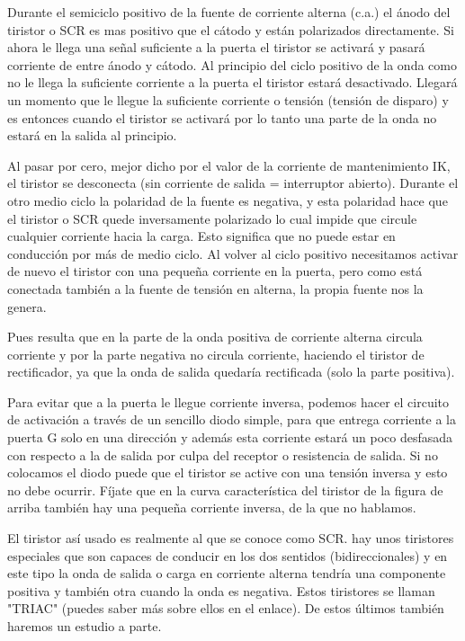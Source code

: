 \documentclass[12pt,a4paper]{article}
\begin{document}
\begin{flushleft}
Durante el semiciclo positivo de la fuente de corriente alterna (c.a.) el ánodo del tiristor o SCR es mas positivo que el cátodo y están polarizados directamente. Si ahora le llega una señal suficiente a la puerta el tiristor se activará y pasará corriente de entre ánodo y cátodo. Al principio del ciclo positivo de la onda como no le llega la suficiente corriente a la puerta el tiristor estará desactivado. Llegará un momento que le llegue la suficiente corriente o tensión (tensión de disparo) y es entonces cuando el tiristor se activará por lo tanto una parte de la onda no estará en la salida al principio.\linebreak

Al pasar por cero, mejor dicho por el valor de la corriente de mantenimiento IK, el tiristor se desconecta (sin corriente de salida = interruptor abierto). Durante el otro medio ciclo la polaridad de la fuente es negativa, y esta polaridad hace que el tiristor o SCR quede inversamente polarizado lo cual impide que circule cualquier corriente hacia la carga. Esto significa que no puede estar en conducción por más de medio ciclo. Al volver al ciclo positivo necesitamos activar de nuevo el tiristor con una pequeña corriente en la puerta, pero como está conectada también a la fuente de tensión en alterna, la propia fuente nos la genera.\\
\end{flushleft}
\newpage
\begin{flushleft}
Pues resulta que en la parte de la onda positiva de corriente alterna circula corriente y por la parte negativa no circula corriente, haciendo el tiristor de rectificador, ya que la onda de salida quedaría rectificada (solo la parte positiva).\linebreak

Para evitar que a la puerta le llegue corriente inversa, podemos hacer el circuito de activación a través de un sencillo diodo simple, para que entrega corriente a la puerta G solo en una dirección y además esta corriente estará un poco desfasada con respecto a la de salida por culpa del receptor o resistencia de salida. Si no colocamos el diodo puede que el tiristor se active con una tensión inversa y esto no debe ocurrir. Fíjate que en la curva característica del tiristor de la figura de arriba también hay una pequeña corriente inversa, de la que no hablamos.\linebreak

El tiristor así usado es realmente al que se conoce como SCR. hay unos tiristores especiales que son capaces de conducir en los dos sentidos (bidireccionales) y en este tipo la onda de salida o carga en corriente alterna tendría una componente positiva y también otra cuando la onda es negativa. Estos tiristores se llaman "TRIAC" (puedes saber más sobre ellos en el enlace). De estos últimos también haremos un estudio a parte.
\end{flushleft}
\newpage
\end{document}
